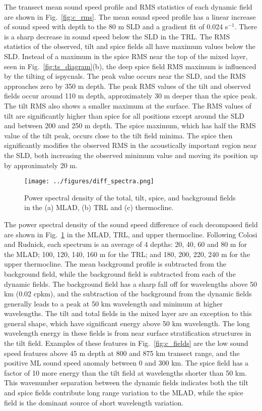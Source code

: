 \documentclass[preprint,NumberedRefs]{JASA}
\begin{document}
The transect mean sound speed profile and RMS statistics of each dynamic field are shown in Fig.~\ref{fig:c_rms}. The mean sound speed profile has a linear increase of sound speed with depth to the 80 m SLD and a gradient fit of 0.024 s$^{-1}$. There is a sharp decrease in sound speed below the SLD in the TRL. The RMS statistics of the observed, tilt and spice fields all have maximum values below the SLD. Instead of a maximum in the spice RMS near the top of the mixed layer, seen in Fig.~\ref{fig:ts_diagram}(b), the deep spice field RMS maximum is influenced by the tilting of ispycnals\citep{ferrari2000}. The peak value occurs near the SLD, and the RMS approaches zero by 350 m depth. The peak RMS values of the tilt and observed fields occur around 110 m depth, approximately 30 m deeper than the spice peak. The tilt RMS also shows a smaller maximum at the surface. The RMS values of tilt are significantly higher than spice for all positions except around the SLD and between 200 and 250 m depth. The spice maximum, which has half the RMS value of the tilt peak, occurs close to the tilt field minima. The spice then significantly modifies the observed RMS in the acoustically important region near the SLD, both increasing the observed minimum value and moving its position up by approximately 20 m.

\begin{figure}
\texttt{[image: ../figures/diff\_spectra.png]}
        \caption{\label{fig:spectra}{Power spectral density of the total, tilt, spice, and background fields in the (a) MLAD, (b) TRL and (c) thermocline.}}
\end{figure}
The power spectral density of the sound speed difference of each decomposed field are shown in Fig.~\ref{fig:spectra} in the MLAD, TRL, and upper thermocline. Following Colosi and Rudnick\cite{colosi2020observations}, each spectrum is an average of 4 depths: 20, 40, 60 and 80 m for the MLAD; 100, 120, 140, 160 m for the TRL; and 180, 200, 220, 240 m for the upper thermocline. The mean background profile is subtracted from the background field, while the background field is subtracted from each of the dynamic fields. The background field has a sharp fall off for wavelengths above 50 km (0.02 cpkm), and the subtraction of the background from the dynamic fields generally leads to a peak at 50 km wavelength and minimum at higher wavelengths. The tilt and total fields in the mixed layer are an exception to this general shape, which have significant energy above 50 km wavelength. The long wavelength energy in these fields is from near surface stratification structures in the tilt field. Examples of these features in Fig.~\ref{fig:c_fields} are the low sound speed features above 45 m depth at 800 and 875 km transect range, and the positive ML sound speed anomaly between 0 and 300 km. The spice field has a factor of 10 more energy than the tilt field at wavelengths shorter than 50 km. This wavenumber separation between the dynamic fields indicates both the tilt and spice fields contribute long range variation to the MLAD, while the spice field is the dominant source of short wavelength variation.
\end{document}
